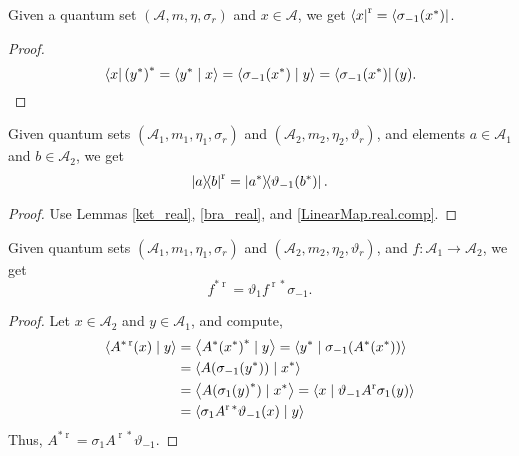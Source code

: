  \begin{lemma}\label{bra_real}\leanok
  Given a quantum set $(\mathcal{A},m,\eta,\sigma_r)$ and $x\in\mathcal{A}$, we get $\left\langle x\right\rvert^{\operatorname{r}}=\left\langle\sigma_{-1}(x^*)\right\rvert$.
 \end{lemma}
 \begin{proof}\leanok
  \[{\left\langle x\right\rvert(y^*)}^*=\left\langle y^* \mid x\right\rangle=\left\langle\sigma_{-1}(x^*) \mid y\right\rangle=\left\langle\sigma_{-1}(x^*)\right\rvert(y).\]
 \end{proof}
 \begin{corollary}\label{rankOne_real}
  \leanok
  Given quantum sets $(\mathcal{A}_1,m_1,\eta_1,\sigma_r)$ and $(\mathcal{A}_2,m_2,\eta_2,\vartheta_r)$, and elements $a\in\mathcal{A}_1$ and $b\in\mathcal{A}_2$, we get
  \[\left\lvert a\right\rangle\!\!\left\langle b\right\rvert^{\operatorname{r}}=\left\lvert a^*\right\rangle\!\!\left\langle\vartheta_{-1}(b^*)\right\rvert.\]
 \end{corollary}
 \begin{proof}\leanok
  Use Lemmas \ref{ket_real}, \ref{bra_real}, and \ref{LinearMap.real.comp}.
 \end{proof}

 \begin{proposition}\label{LinearMap.adjoint_real_eq}
  \leanok
  Given quantum sets $(\mathcal{A}_1,m_1,\eta_1,\sigma_r)$ and $(\mathcal{A}_2,m_2,\eta_2,\vartheta_r)$, and $f\colon\mathcal{A}_1\to\mathcal{A}_2$, we get
  \[ f^{*\operatorname{r}}=\vartheta_1f^{\operatorname{r}*}\sigma_{-1}.\]
 \end{proposition}
 \begin{proof}\leanok
  Let $x\in{\mathcal{A}_2}$ and $y\in \mathcal{A}_1$, and compute,
  \begin{align*}
   \left\langle{A^{*\operatorname{r}}}(x) \mid y\right\rangle &= \left\langle{A^*(x^*)}^* \mid y\right\rangle =\left\langle y^* \mid \sigma_{-1}(A^*(x^*))\right\rangle\\
   &= \left\langle A(\sigma_{-1}(y^*)) \mid x^*\right\rangle\\
   &= \left\langle A({\sigma_{1}(y)}^*) \mid x^*\right\rangle
   = \left\langle x \mid \vartheta_{-1}A^{\operatorname{r}}\sigma_{1}(y)\right\rangle\\
   &= \left\langle\sigma_{1}A^{\operatorname{r}*}\vartheta_{-1}(x) \mid y\right\rangle
  \end{align*}
  Thus, $A^{*\operatorname{r}}=\sigma_{1}A^{\operatorname{r}*}\vartheta_{-1}$.
 \end{proof}

